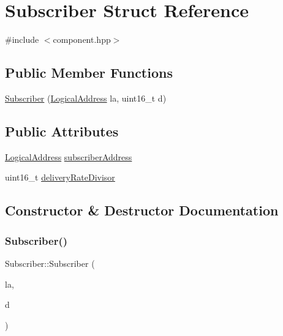 \hypertarget{structSubscriber}{}\section{Subscriber Struct Reference}
\label{structSubscriber}


{\ttfamily \#include $<$component.\+hpp$>$}

\subsection*{Public Member Functions}
\begin{DoxyCompactItemize}
\item 
\hyperlink{structSubscriber_a64dab4d8803d8814bf7a6e7162a2b436}{Subscriber} (\hyperlink{structLogicalAddress}{Logical\+Address} la, uint16\+\_\+t d)
\end{DoxyCompactItemize}
\subsection*{Public Attributes}
\begin{DoxyCompactItemize}
\item 
\hyperlink{structLogicalAddress}{Logical\+Address} \hyperlink{structSubscriber_ad27b381f3d2a33920ff6664e4013abc3}{subscriber\+Address}
\item 
uint16\+\_\+t \hyperlink{structSubscriber_a8221a4d1ba53e0407b27e44cda4a87ab}{delivery\+Rate\+Divisor}
\end{DoxyCompactItemize}


\subsection{Constructor \& Destructor Documentation}
\mbox{\label{structSubscriber_a64dab4d8803d8814bf7a6e7162a2b436}} 
\subsubsection{\texorpdfstring{Subscriber()}{Subscriber()}}
{\footnotesize\ttfamily Subscriber\+::\+Subscriber (\begin{DoxyParamCaption}\item[{\hyperlink{structLogicalAddress}{Logical\+Address}}]{la,  }\item[{uint16\+\_\+t}]{d }\end{DoxyParamCaption})\hspace{0.3cm}{\ttfamily [inline]}}



